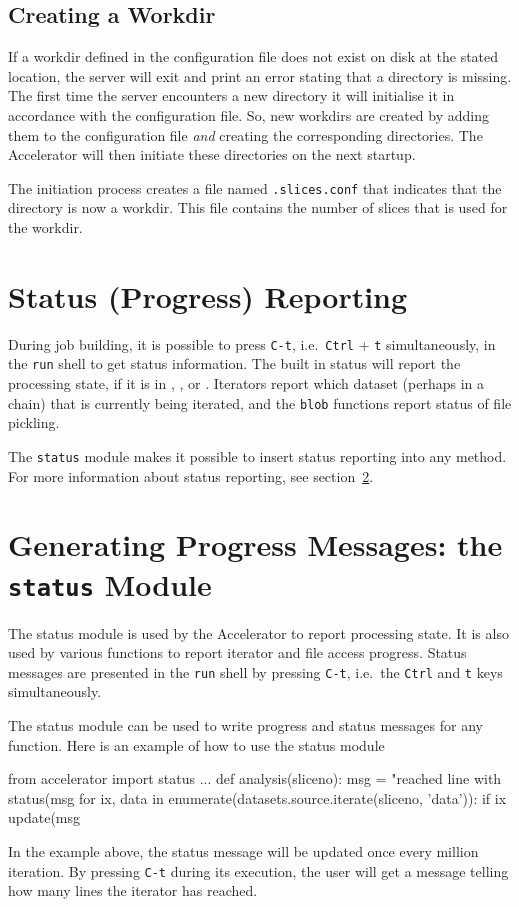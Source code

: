\subsection{Creating a Workdir}
If a workdir defined in the configuration file does not exist on disk
at the stated location, the server will exit and print an error
stating that a directory is missing.  The first time the server
encounters a new directory it will initialise it in accordance with
the configuration file.  So, new workdirs are created by adding them
to the configuration file \textsl{and} creating the corresponding
directories.  The Accelerator will then initiate these directories on
the next startup.

The initiation process creates a file named \texttt{.slices.conf} that
indicates that the directory is now a workdir.  This file contains the
number of slices that is used for the workdir.



\section{Status (Progress) Reporting}
During job building, it is possible to press \texttt{C-t},
i.e.\ \texttt{Ctrl} + \texttt{t} simultaneously, in the \texttt{run}
shell to get status information.  The built in status will report the
processing state, if it is in \prepare, \analysis, or \synthesis.
Iterators report which dataset (perhaps in a chain) that is currently
being iterated, and the \texttt{blob} functions report status of file
pickling.

The \texttt{status} module makes it possible to insert
status reporting into any method.  For more information about status
reporting, see section~\ref{sec:statusreporting}.



\section{Generating Progress Messages:  the \texttt{status} Module}
\label{sec:statusreporting}
The status module is used by the Accelerator to report processing
state.  It is also used by various functions to report iterator and
file access progress.  Status messages are presented in
the \texttt{run} shell by pressing \texttt{C-t}, i.e.\
the \texttt{Ctrl} and \texttt{t} keys simultaneously.

The status module can be used to write progress and status messages
for any function.  Here is an example of how to use the status module
\begin{python}
from accelerator import status
...
def analysis(sliceno):
    msg = "reached line %
    with status(msg %
        for ix, data in enumerate(datasets.source.iterate(sliceno, 'data')):
            if ix %
                update(msg %
\end{python}
In the example above, the status message will be updated once every
million iteration.  By pressing \texttt{C-t} during its execution, the
user will get a message telling how many lines the iterator has
reached.



